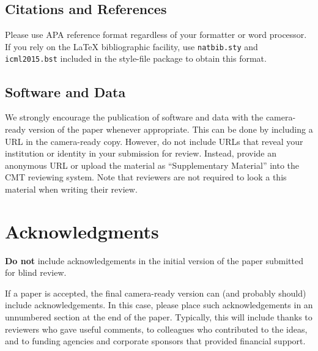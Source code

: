 \documentclass{article}
\begin{document}
\subsection{Citations and References} 

Please use APA reference format regardless of your formatter
or word processor. If you rely on the \LaTeX\/ bibliographic 
facility, use {\tt natbib.sty} and {\tt icml2015.bst} 
included in the style-file package to obtain this format.


\subsection{Software and Data}

We strongly encourage the publication of software and data with the
camera-ready version of the paper whenever appropriate.  This can be
done by including a URL in the camera-ready copy.  However, do not
include URLs that reveal your institution or identity in your
submission for review.  Instead, provide an anonymous URL or upload
the material as ``Supplementary Material'' into the CMT reviewing
system.  Note that reviewers are not required to look a this material
when writing their review.


\section*{Acknowledgments} 
 
\textbf{Do not} include acknowledgements in the initial version of
the paper submitted for blind review.

If a paper is accepted, the final camera-ready version can (and
probably should) include acknowledgements. In this case, please
place such acknowledgements in an unnumbered section at the
end of the paper. Typically, this will include thanks to reviewers
who gave useful comments, to colleagues who contributed to the ideas, 
and to funding agencies and corporate sponsors that provided financial 
support.  

\fi

\nocite{langley00}
\end{document}
